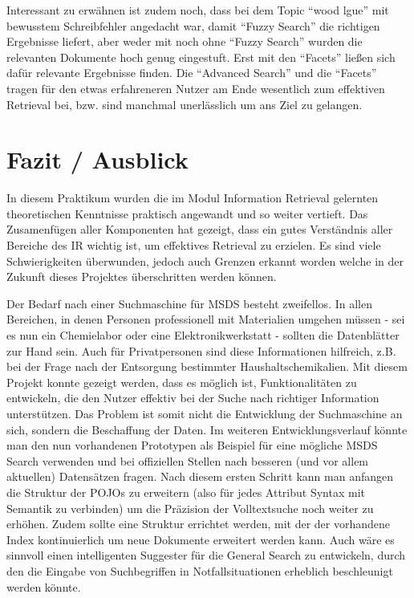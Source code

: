 \documentclass[oneside, a4paper, 12pt, titlepage]{article}
\begin{document}
Interessant zu erwähnen ist zudem noch, dass bei dem Topic ``wood lgue'' mit bewusstem Schreibfehler angedacht war, damit ``Fuzzy Search'' die richtigen Ergebnisse liefert, aber weder mit noch ohne ``Fuzzy Search'' wurden die relevanten Dokumente hoch genug eingestuft.
Erst mit den ``Facets'' ließen sich dafür relevante Ergebnisse finden.
Die ``Advanced Search'' und die ``Facets'' tragen für den etwas erfahreneren Nutzer am Ende wesentlich zum effektiven Retrieval bei, bzw. sind manchmal unerlässlich um ans Ziel zu gelangen.\\

\section{Fazit / Ausblick}
In diesem Praktikum wurden die im Modul Information Retrieval gelernten theoretischen Kenntnisse praktisch angewandt und so weiter vertieft.
Das Zusamenfügen aller Komponenten hat gezeigt, dass ein gutes Verständnis aller Bereiche des IR wichtig ist, um effektives Retrieval zu erzielen. Es sind viele Schwierigkeiten überwunden, jedoch auch Grenzen erkannt worden welche in der Zukunft dieses Projektes überschritten werden können.

Der Bedarf nach einer Suchmaschine für MSDS besteht zweifellos.
In allen Bereichen, in denen Personen professionell mit Materialien umgehen müssen - sei es nun ein Chemielabor oder eine Elektronikwerkstatt - sollten die Datenblätter zur Hand sein.
Auch für Privatpersonen sind diese Informationen hilfreich, z.B. bei der Frage nach der Entsorgung bestimmter Haushaltschemikalien.
Mit diesem Projekt konnte gezeigt werden, dass es möglich ist, Funktionalitäten zu entwickeln, die den Nutzer effektiv bei der Suche nach richtiger Information unterstützen.
Das Problem ist somit nicht die Entwicklung der Suchmaschine an sich, sondern die Beschaffung der Daten.
Im weiteren Entwicklungsverlauf könnte man den nun vorhandenen Prototypen als Beispiel für eine mögliche MSDS Search verwenden und bei offiziellen Stellen nach besseren (und vor allem aktuellen) Datensätzen fragen.
Nach diesem ersten Schritt kann man anfangen die Struktur der POJOs zu erweitern (also für jedes Attribut Syntax mit Semantik zu verbinden) um die Präzision der Volltextsuche noch weiter zu erhöhen.
Zudem sollte eine Struktur errichtet werden, mit der der vorhandene Index kontinuierlich um neue Dokumente erweitert werden kann. Auch wäre es sinnvoll einen intelligenten Suggester für die General Search zu entwickeln, durch den die Eingabe von Suchbegriffen in Notfallsituationen erheblich beschleunigt werden könnte.
\end{document}
